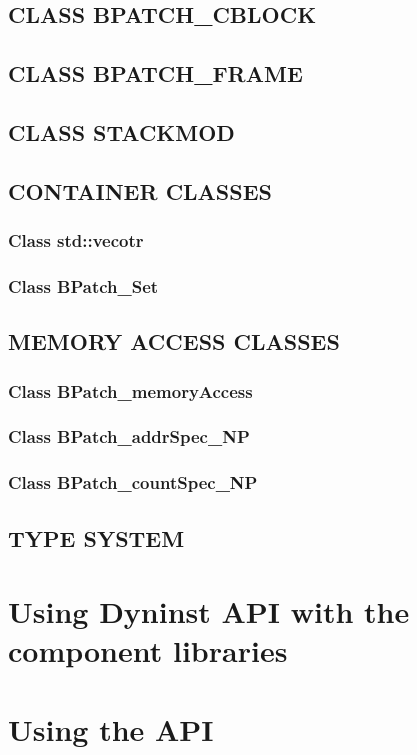 \documentclass[twopages,a4paper]{article}
\begin{document}
\subsection{CLASS BPATCH\_CBLOCK}
\subsection{CLASS BPATCH\_FRAME}
\subsection{CLASS STACKMOD}
\subsection{CONTAINER CLASSES}
\subsubsection{Class std::vecotr}
\subsubsection{Class BPatch\_Set}
\subsection{MEMORY ACCESS CLASSES}
\subsubsection{Class BPatch\_memoryAccess}
\subsubsection{Class BPatch\_addrSpec\_NP}
\subsubsection{Class BPatch\_countSpec\_NP}
\subsection{TYPE SYSTEM}\label{sec:type_system}

\pagebreak
\section{Using Dyninst API with the component libraries}
\section{Using the API}
\end{document}
